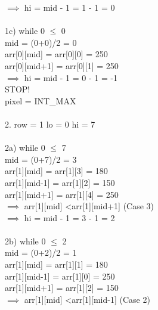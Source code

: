 \documentclass[10pt]{article}
\begin{document}
\begin{multicols*}{2}
       $\implies$ hi = mid - 1 = 1 - 1 = 0\\\\1c) while 0 $\leq$ 0\\
    
        mid = (0+0)/2 = 0\\

        arr[0][mid] = arr[0][0] = 250\\

        arr[0][mid+1] = arr[0][1] = 250\\
        
        $\implies$ hi = mid - 1 = 0 - 1 = -1\\
        
        STOP!\\
        
        pixel = INT\_MAX\\\\2. row = 1 lo = 0 hi = 7\\\\2a) while 0 $\leq$ 7\\

        mid = (0+7)/2 = 3\\

        arr[1][mid] = arr[1][3] = 180\\

        arr[1][mid-1] = arr[1][2] = 150\\

        arr[1][mid+1] = arr[1][4] = 250\\
        
        $\implies$ arr[1][mid] \textless arr[1][mid+1] (Case 3)\\
        
        $\implies$ hi = mid - 1 = 3 - 1 = 2\\\\2b) while 0 $\leq$ 2\\
    
        mid = (0+2)/2 = 1\\

        arr[1][mid] = arr[1][1] = 180\\

        arr[1][mid-1] = arr[1][0] = 250\\

        arr[1][mid+1] = arr[1][2] = 150\\
        
        $\implies$ arr[1][mid] \textless arr[1][mid-1] (Case 2)\\
        

\end{multicols*}
\end{document}
